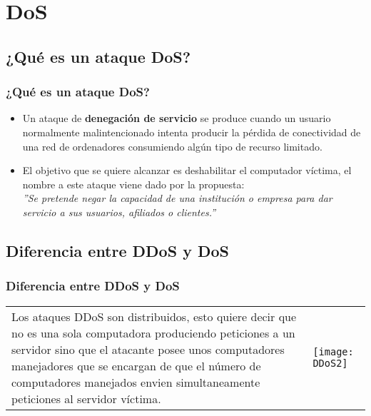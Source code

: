 \documentclass{beamer}
\begin{document}
\section{DoS}

	\subsection{¿Qué es un ataque DoS?}
	\begin{frame}
	\frametitle{¿Qué es un ataque DoS?}
	\begin{itemize}
	
	\item Un ataque de \textbf{denegación de servicio} se produce cuando un usuario normalmente malintencionado intenta producir la pérdida de conectividad de una red de ordenadores consumiendo algún tipo de recurso limitado.
	\item El objetivo que se quiere alcanzar es deshabilitar el computador víctima, el nombre a este ataque viene dado por la propuesta:\\
\textit{	 ''Se pretende negar la capacidad de una institución o empresa para dar servicio a sus usuarios, afiliados o clientes.''}
	
	\end{itemize}
	\end{frame}
	
	\subsection{Diferencia entre DDoS y DoS}
	\begin{frame}
	\frametitle{Diferencia entre DDoS y DoS}
	\begin{tabular}{ll}
	
	\multicolumn{1}{p{5.5cm}}{\vspace{1cm}
	Los ataques DDoS son distribuidos, esto quiere decir que no es una sola computadora produciendo peticiones a un servidor sino que el atacante posee unos computadores manejadores que se encargan de que el número de computadores manejados envien simultaneamente peticiones al servidor víctima.}  & \multicolumn{1}{p{5.5cm}}{\begin{center}
	\texttt{[image: DDoS2]}
	\end{center}}\\
	\end{tabular} 
	\end{frame}
	
\end{document}
